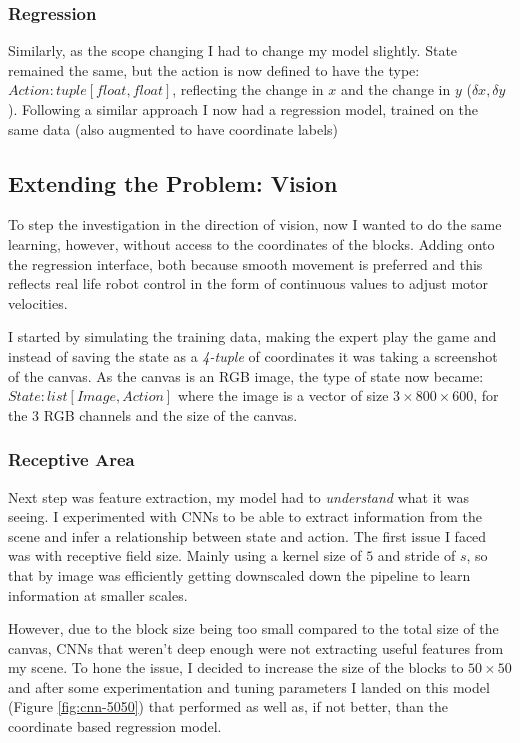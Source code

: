 \subsubsection{Regression}
Similarly, as the scope changing I had to change my model slightly. State remained the same, but the action is now defined to have the type: \(Action: tuple[float, float]\), reflecting the change in $x$ and the change in $y$ (\(\delta x , \delta y\)).
Following a similar approach I now had a regression model, trained on the same data (also augmented to have coordinate labels)


\subsection{Extending the Problem: Vision}
To step the investigation in the direction of vision, now I wanted to do the same learning, however, without access to the coordinates of the blocks. Adding onto the regression interface, both because smooth movement is preferred and this reflects real life robot control in the form of continuous values to adjust motor velocities.

I started by simulating the training data, making the expert play the game and instead of saving the state as a \emph{4-tuple} of coordinates it was taking a screenshot of the canvas. As the canvas is an RGB image, the type of state now became: $State: list[Image, Action]$ where the image is a vector of size $3 \times 800 \times 600$, for the 3 RGB channels and the size of the canvas.

\subsubsection{Receptive Area}
Next step was feature extraction, my model had to \emph{understand} what it was seeing. I experimented with CNNs to be able to extract information from the scene and infer a relationship between state and action. The first issue I faced was with receptive field size. Mainly using a kernel size of $5$ and stride of $s$, so that by image was efficiently getting downscaled down the pipeline to learn information at smaller scales. 

However, due to the block size being too small compared to the total size of the canvas, CNNs that weren't deep enough were not extracting useful features from my scene. To hone the issue, I decided to increase the size of the blocks to $50 \times 50$ and after some experimentation and tuning parameters I landed on this model (Figure \ref{fig:cnn-5050}) that performed as well as, if not better, than the coordinate based regression model.

